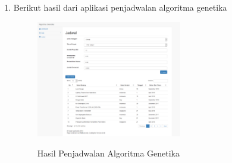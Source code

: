 \begin{enumerate}
        \item Berikut hasil dari aplikasi penjadwalan algoritma genetika
    		\begin{figure}[!htbp]
        		\centering
        		\caption{Hasil Penjadwalan Algoritma Genetika}
        		\includegraphics[width=0.6\textwidth]{figures/GA15.png}
        		\label{GA15}
    		\end{figure}
\end{enumerate}